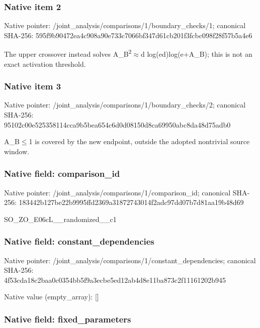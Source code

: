 \documentclass[10pt,a4paper]{article}
\begin{document}
\subsubsection{Native item 2}


Native pointer: /joint\_analysis/comparis\allowbreak{}ons/1/boundary\_checks/1; canonical SHA-256: 595f9b90472ea4c908a90e73\allowbreak{}3c7066bf347d61cb201f3fcb\allowbreak{}c098f28f57b5a4e6


The upper crossover instead solves A\_B\textsuperscript{2}\ensuremath{\approx}d log(ed)log(e+A\_B); this is not an exact activation threshold.


\subsubsection{Native item 3}


Native pointer: /joint\_analysis/comparis\allowbreak{}ons/1/boundary\_checks/2; canonical SHA-256: 95102c00e525358114cca9b5\allowbreak{}bea654c6d0d08150d8ca6995\allowbreak{}0abc8da48d75adb0


A\_B\ensuremath{\le}1 is covered by the new endpoint, outside the adopted nontrivial source window.


\subsubsection{Native field: comparison\_id}


Native pointer: /joint\_analysis/comparis\allowbreak{}ons/1/comparison\_id; canonical SHA-256: 183442b127be22b9995ffd23\allowbreak{}69a31872743014f2adc97dd0\allowbreak{}7b7d81aa19b48d69


SO\_ZO\_E06cL\_\_randomized\_\_c1


\subsubsection{Native field: constant\_dependencies}


Native pointer: /joint\_analysis/comparis\allowbreak{}ons/1/constant\_dependenc\allowbreak{}ies; canonical SHA-256: 4f53cda18c2baa0c0354bb5f\allowbreak{}9a3ecbe5ed12ab4d8e11ba87\allowbreak{}3c2f11161202b945



Native value (empty\_array): []



\subsubsection{Native field: fixed\_parameters}
\end{document}
